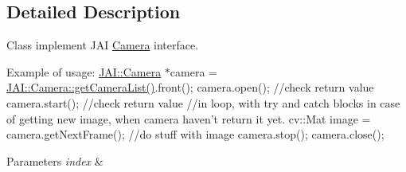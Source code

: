 \subsection{Detailed Description}
Class implement J\-A\-I \hyperlink{class_j_a_i_1_1_camera}{Camera} interface. 

Example of usage\-: \hyperlink{class_j_a_i_1_1_camera}{J\-A\-I\-::\-Camera} $\ast$camera = \hyperlink{class_j_a_i_1_1_camera_abf0561e5508ed968e59cec9b6cee80c2}{J\-A\-I\-::\-Camera\-::get\-Camera\-List()}.front(); camera.\-open(); //check return value camera.\-start(); //check return value //in loop, with try and catch blocks in case of getting new image, when camera haven't return it yet. cv\-::\-Mat image = camera.\-get\-Next\-Frame(); //do stuff with image camera.\-stop(); camera.\-close(); 
\begin{DoxyParams}{Parameters}
{\em index} & \\
\hline
\end{DoxyParams}


